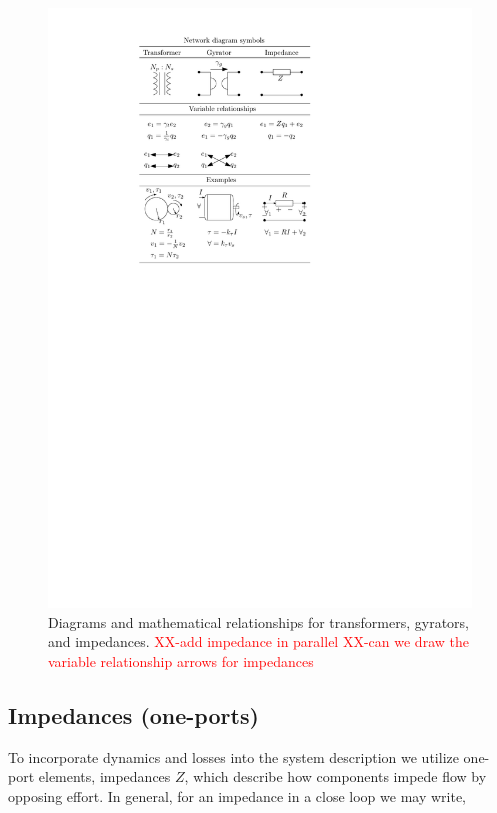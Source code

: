\documentclass[lettersize,journal]{IEEEtran}
\newcommand{\rc}[1]{\textcolor{red}{#1}}
\begin{document}
\begin{figure}[tb]
        \centering
        \includegraphics[width=\columnwidth]{wec_as_multiport_transformer_gyrator_impedance.pdf}
        \caption{Diagrams and mathematical relationships for transformers, gyrators, and impedances. \rc{XX-add impedance in parallel} \rc{XX-can we draw the variable relationship arrows for impedances}}
        \label{fig:wec_as_multiport_transformer_gyrator}
\end{figure}

\subsection{Impedances (one-ports)}\label{sec:gyrators}
To incorporate dynamics and losses into the system description we utilize one-port elements, impedances $Z$, which describe how components impede flow by opposing effort. In general, for an impedance in a close loop we may write,
\end{document}
